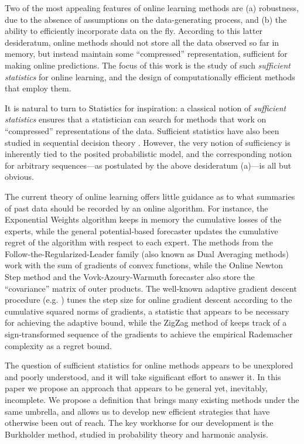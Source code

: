 
Two of the most appealing features of online learning methods are
	 (a) robustness, due to the absence of assumptions on the data-generating process, and (b) the ability to efficiently incorporate data on the fly. According to this latter desideratum, online methods should not store all the data observed so far in memory, but instead maintain some ``compressed'' representation, sufficient for making online predictions. The focus of this work is the study of such \emph{sufficient statistics} for online learning, and the design of computationally efficient methods that employ them.
	
It is natural to turn to Statistics for inspiration: a classical notion of \emph{sufficient statistics} \citep{ra1922mathematical} ensures that a statistician can search for methods that work on ``compressed'' representations of the data. Sufficient statistics have also been studied in sequential decision theory \citep{bahadur1954sufficiency}. However, the very notion of sufficiency is inherently tied to the posited probabilistic model, and the corresponding notion for arbitrary sequences---as postulated by the above desideratum (a)---is all but obvious.


The current theory of online learning offers little guidance as to what summaries of past data should be recorded by an online algorithm. For instance, the Exponential Weights algorithm \citep{vovk1990aggregating,littlestone1994weighted} keeps in memory the cumulative losses of the experts, while the general potential-based forecaster \citep{PLG} updates the cumulative regret of the algorithm with respect to each expert. The methods from the Follow-the-Regularized-Leader family (also known as Dual Averaging methods) work with the sum of gradients of convex functions, while the Online Newton Step \citep{hazan2007logarithmic} method and the Vovk-Azoury-Warmuth forecaster \citep{PLG} also store the ``covariance'' matrix of outer products. The well-known adaptive gradient descent procedure (e.g. \citep{rakhlin2015equivalence}) tunes the step size for online gradient descent according to the cumulative squared norms of gradients, a statistic that appears to be necessary for achieving the adaptive bound, while the ZigZag method of \cite{foster2017zigzag} keeps track of a sign-transformed sequence of the gradients to achieve the empirical Rademacher complexity as a regret bound.

The question of sufficient statistics for online methods appears to be unexplored and poorly understood, and it will take significant effort to answer it. In this paper we propose an approach that appears to be general yet, inevitably, incomplete. We propose a definition that brings many existing methods under the same umbrella, and allows us to develop new efficient strategies that have otherwise been out of reach. The key workhorse for our development is the Burkholder method, studied in probability theory and harmonic analysis.

